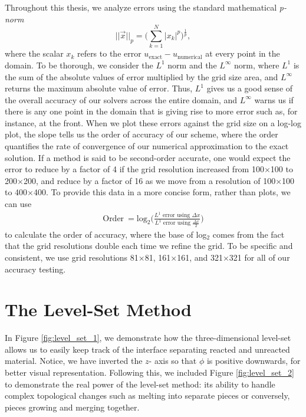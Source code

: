 \documentclass[oneside,12pt,final]{/Applications/TeX/packages/ucthesis-CA2012}
\begin{document}
\begin{mainmatter}
Throughout this thesis, we analyze errors using the standard mathematical \textit{p-norm}
\begin{equation}
||\vec{x}||_{p} = \bigg({\displaystyle \sum_{k=1}^{N}  |x_{k}|^{p} }\bigg)^{\frac{1}{p}},
\end{equation}
where the scalar $x_k$ refers to the error $u_\text{exact} - u_\text{numerical}$ at every point in the domain. To be thorough, we consider the $L^1$ norm and the $L^\infty$ norm, where $L^1$ is the sum of the absolute values of error multiplied by the grid size area, and $L^\infty$ returns the maximum absolute value of error. Thus, $L^1$ gives us a good sense of the overall accuracy of our solvers across the entire domain, and $L^\infty$ warns us if there is any one point in the domain that is giving rise to more error such as, for instance, at the front. When we plot these errors against the grid size on a log-log plot, the slope tells us the order of accuracy of our scheme, where the order quantifies the rate of convergence of our numerical approximation to the exact solution. If a method is said to be second-order accurate, one would expect the error to reduce by a factor of 4 if the grid resolution increased from 100$\times$100 to 200$\times$200, and reduce by a factor of 16 as we move from a resolution of 100$\times$100 to 400$\times$400. To provide this data in a more concise form, rather than plots, we can use 
\begin{equation}\label{eqn:order}
\begin{aligned}
\text{Order} \>= \text{log}_2\bigg(\frac{L^1 \text{ error using $\Delta x$}}{L^1 \text{ error using $\frac{\Delta x}{2}$}}\bigg)
\end{aligned}
\end{equation}
to calculate the order of accuracy, where the base of log$_2$ comes from the fact that the grid resolutions double each time we refine the grid. To be specific and consistent, we use grid resolutions 81$\times$81, 161$\times$161, and 321$\times$321 for all of our accuracy testing.

\chapter{The Level-Set Method}\label{section:Level_Set_Method}

In Figure \ref{fig:level_set_1}, we demonstrate how the three-dimensional level-set allows us to easily keep track of the interface separating reacted and unreacted material. Notice, we have inverted the $z$- axis so that $\phi$ is positive downwards, for better visual representation. Following this, we included Figure \ref{fig:level_set_2} to demonstrate the real power of the level-set method: its ability to handle complex topological changes such as melting into separate pieces or conversely, pieces growing and merging together.


\end{mainmatter}
\end{document}

